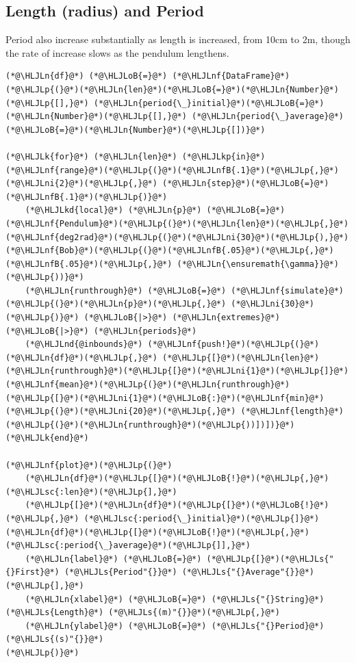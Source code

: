 \documentclass[12pt,a4paper]{article}
\newcommand{\HLJLk}[1]{\textcolor[RGB]{148,91,176}{\textbf{#1}}}
\newcommand{\HLJLkd}[1]{\textcolor[RGB]{214,102,97}{\textit{#1}}}
\newcommand{\HLJLkp}[1]{\textcolor[RGB]{148,91,176}{\textbf{#1}}}
\newcommand{\HLJLn}[1]{#1}
\newcommand{\HLJLnd}[1]{\textcolor[RGB]{214,102,97}{#1}}
\newcommand{\HLJLnf}[1]{\textcolor[RGB]{66,102,213}{#1}}
\newcommand{\HLJLs}[1]{\textcolor[RGB]{201,61,57}{#1}}
\newcommand{\HLJLsc}[1]{\textcolor[RGB]{201,61,57}{#1}}
\newcommand{\HLJLnfB}[1]{\textcolor[RGB]{59,151,46}{#1}}
\newcommand{\HLJLni}[1]{\textcolor[RGB]{59,151,46}{#1}}
\newcommand{\HLJLoB}[1]{\textcolor[RGB]{102,102,102}{\textbf{#1}}}
\newcommand{\HLJLp}[1]{#1}
\begin{document}
\subsection{Length (radius) and Period}
Period also increase substantially as length is increased, from 10cm to 2m, though the rate of increase slows as the pendulum lengthens.


\begin{lstlisting}
(*@\HLJLn{df}@*) (*@\HLJLoB{=}@*) (*@\HLJLnf{DataFrame}@*)(*@\HLJLp{(}@*)(*@\HLJLn{len}@*)(*@\HLJLoB{=}@*)(*@\HLJLn{Number}@*)(*@\HLJLp{[],}@*) (*@\HLJLn{period{\_}initial}@*)(*@\HLJLoB{=}@*)(*@\HLJLn{Number}@*)(*@\HLJLp{[],}@*) (*@\HLJLn{period{\_}average}@*)(*@\HLJLoB{=}@*)(*@\HLJLn{Number}@*)(*@\HLJLp{[])}@*)

(*@\HLJLk{for}@*) (*@\HLJLn{len}@*) (*@\HLJLkp{in}@*) (*@\HLJLnf{range}@*)(*@\HLJLp{(}@*)(*@\HLJLnfB{.1}@*)(*@\HLJLp{,}@*) (*@\HLJLni{2}@*)(*@\HLJLp{,}@*) (*@\HLJLn{step}@*)(*@\HLJLoB{=}@*)(*@\HLJLnfB{.1}@*)(*@\HLJLp{)}@*)
    (*@\HLJLkd{local}@*) (*@\HLJLn{p}@*) (*@\HLJLoB{=}@*) (*@\HLJLnf{Pendulum}@*)(*@\HLJLp{(}@*)(*@\HLJLn{len}@*)(*@\HLJLp{,}@*) (*@\HLJLnf{deg2rad}@*)(*@\HLJLp{(}@*)(*@\HLJLni{30}@*)(*@\HLJLp{),}@*) (*@\HLJLnf{Bob}@*)(*@\HLJLp{(}@*)(*@\HLJLnfB{.05}@*)(*@\HLJLp{,}@*) (*@\HLJLnfB{.05}@*)(*@\HLJLp{,}@*) (*@\HLJLn{\ensuremath{\gamma}}@*)(*@\HLJLp{))}@*)
    (*@\HLJLn{runthrough}@*) (*@\HLJLoB{=}@*) (*@\HLJLnf{simulate}@*)(*@\HLJLp{(}@*)(*@\HLJLn{p}@*)(*@\HLJLp{,}@*) (*@\HLJLni{30}@*)(*@\HLJLp{)}@*) (*@\HLJLoB{|>}@*) (*@\HLJLn{extremes}@*) (*@\HLJLoB{|>}@*) (*@\HLJLn{periods}@*)
    (*@\HLJLnd{@inbounds}@*) (*@\HLJLnf{push!}@*)(*@\HLJLp{(}@*)(*@\HLJLn{df}@*)(*@\HLJLp{,}@*) (*@\HLJLp{[}@*)(*@\HLJLn{len}@*) (*@\HLJLn{runthrough}@*)(*@\HLJLp{[}@*)(*@\HLJLni{1}@*)(*@\HLJLp{]}@*) (*@\HLJLnf{mean}@*)(*@\HLJLp{(}@*)(*@\HLJLn{runthrough}@*)(*@\HLJLp{[}@*)(*@\HLJLni{1}@*)(*@\HLJLoB{:}@*)(*@\HLJLnf{min}@*)(*@\HLJLp{(}@*)(*@\HLJLni{20}@*)(*@\HLJLp{,}@*) (*@\HLJLnf{length}@*)(*@\HLJLp{(}@*)(*@\HLJLn{runthrough}@*)(*@\HLJLp{))])])}@*)
(*@\HLJLk{end}@*)

(*@\HLJLnf{plot}@*)(*@\HLJLp{(}@*)
    (*@\HLJLn{df}@*)(*@\HLJLp{[}@*)(*@\HLJLoB{!}@*)(*@\HLJLp{,}@*) (*@\HLJLsc{:len}@*)(*@\HLJLp{],}@*)
    (*@\HLJLp{[}@*)(*@\HLJLn{df}@*)(*@\HLJLp{[}@*)(*@\HLJLoB{!}@*)(*@\HLJLp{,}@*) (*@\HLJLsc{:period{\_}initial}@*)(*@\HLJLp{]}@*) (*@\HLJLn{df}@*)(*@\HLJLp{[}@*)(*@\HLJLoB{!}@*)(*@\HLJLp{,}@*) (*@\HLJLsc{:period{\_}average}@*)(*@\HLJLp{]],}@*)
    (*@\HLJLn{label}@*) (*@\HLJLoB{=}@*) (*@\HLJLp{[}@*)(*@\HLJLs{"{}First}@*) (*@\HLJLs{Period"{}}@*) (*@\HLJLs{"{}Average"{}}@*)(*@\HLJLp{],}@*)
    (*@\HLJLn{xlabel}@*) (*@\HLJLoB{=}@*) (*@\HLJLs{"{}String}@*) (*@\HLJLs{Length}@*) (*@\HLJLs{(m)"{}}@*)(*@\HLJLp{,}@*)
    (*@\HLJLn{ylabel}@*) (*@\HLJLoB{=}@*) (*@\HLJLs{"{}Period}@*) (*@\HLJLs{(s)"{}}@*)
(*@\HLJLp{)}@*)
\end{lstlisting}
\end{document}
